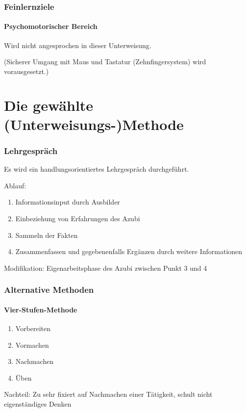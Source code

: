 \documentclass{beamer}
\begin{document}
\setcounter{subsection}{1}
\begin{frame}
  \frametitle{Feinlernziele}
  \framesubtitle{Psychomotorischer Bereich}
   Wird nicht angesprochen in dieser Unterweisung.
   
   (Sicherer Umgang mit Maus und Tastatur (Zehnfingersystem) wird vorausgesetzt.)
\end{frame}

\section{Die gewählte (Unterweisungs-)Methode}

\setcounter{subsection}{1}
\begin{frame}
  \frametitle{Lehrgespräch}
  
    Es wird ein handlungsorientiertes Lehrgespräch durchgeführt.
  
    Ablauf:
  
    \begin{enumerate}
      \item{Informationsinput durch Ausbilder}
      \item{Einbeziehung von Erfahrungen des Azubi}
      \item{Sammeln der Fakten}
      \item{Zusammenfassen und gegebenenfalls Ergänzen durch weitere Informationen}  
    \end{enumerate}
    
    Modifikation: Eigenarbeitsphase des Azubi zwischen Punkt 3 und 4
\end{frame}

\setcounter{subsection}{1}
\begin{frame}
  \frametitle{Alternative Methoden}
    \framesubtitle{Vier-Stufen-Methode}
    
    \begin{enumerate}
      \item{Vorbereiten}
      \item{Vormachen}
      \item{Nachmachen}
      \item{Üben}  
    \end{enumerate}    
      
      Nachteil: Zu sehr fixiert auf Nachmachen einer Tätigkeit, schult nicht eigenständiges Denken
\end{frame}
\end{document}
